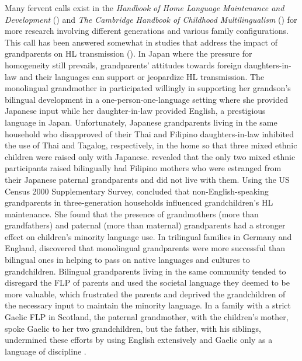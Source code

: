 \documentclass[output=paper,colorlinks,citecolor=brown]{langscibook}
\begin{document}
Many fervent calls exist in the \textit{Handbook of Home Language Maintenance and Development} (\citealt{SchalleyEisenchlas2020}) and \textit{The Cambridge Handbook of Childhood Multilingualism} (\citealt{StavansJessner2022}) for more research involving different generations and various family configurations. This call has been answered somewhat in studies that address the impact of grandparents on HL transmission (\citealt{Meddegama2020, Spolsky2012}). In Japan where the pressure for homogeneity still prevails, grandparents’ attitudes towards foreign daughters-in-law and their languages can support or jeopardize HL transmission. The monolingual grandmother in \citet{NakamuraQuay2012} participated willingly in supporting her grandson’s bilingual development in a one-person-one-language setting where she provided Japanese input while her daughter-in-law provided English, a prestigious language in Japan. Unfortunately, Japanese grandparents living in the same household who disapproved of their Thai and Filipino daughters-in-law inhibited the use of Thai and Tagalog, respectively, in the home so that three mixed ethnic children were raised only with Japanese. \citet{Nakamura2020} revealed that the only two mixed ethnic participants raised bilingually had Filipino mothers who were estranged from their Japanese paternal grandparents and did not live with them. Using the US Census 2000 Supplementary Survey, \citet{Ishizawa2004} concluded that non-English-speaking grandparents in three-generation households influenced grandchildren’s HL maintenance. She found that the presence of grandmothers (more than grandfathers) and paternal (more than maternal) grandparents had a stronger effect on children’s minority language use. In trilingual families in Germany and England, \citet{Braun2012} discovered that monolingual grandparents were more successful than bilingual ones in helping to pass on native languages and cultures to grandchildren. Bilingual grandparents living in the same community tended to disregard the FLP of parents and used the societal language they deemed to be more valuable, which frustrated the parents and deprived the grandchildren of the necessary input to maintain the minority language. In a family with a strict Gaelic FLP in Scotland, the paternal grandmother, with the children’s mother, spoke Gaelic to her two grandchildren, but the father, with his siblings, undermined these efforts by using English extensively and Gaelic only as a language of discipline \citep{Smith-Christmas2014}.
\end{document}
